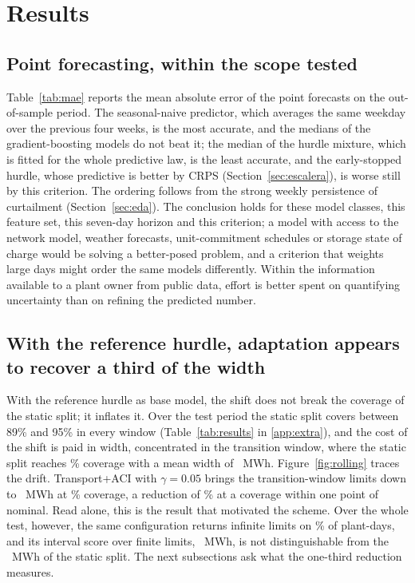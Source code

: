 \section{Results}
\label{sec:results}

\subsection{Point forecasting, within the scope tested}
\label{sec:punto}

Table~\ref{tab:mae} reports the mean absolute error of the point forecasts on the out-of-sample period. The seasonal-naive predictor, which averages the same weekday over the previous four weeks, is the most accurate, and the medians of the gradient-boosting models do not beat it; the median of the hurdle mixture, which is fitted for the whole predictive law, is the least accurate, and the early-stopped hurdle, whose predictive is better by CRPS (Section~\ref{sec:escalera}), is worse still by this criterion. The ordering follows from the strong weekly persistence of curtailment (Section~\ref{sec:eda}). The conclusion holds for these model classes, this feature set, this seven-day horizon and this criterion; a model with access to the network model, weather forecasts, unit-commitment schedules or storage state of charge would be solving a better-posed problem, and a criterion that weights large days might order the same models differently. Within the information available to a plant owner from public data, effort is better spent on quantifying uncertainty than on refining the predicted number.



\subsection{With the reference hurdle, adaptation appears to recover a third of the width}
\label{sec:hurdle}

With the reference hurdle as base model, the shift does not break the coverage of the static split; it inflates it. Over the test period the static split covers between 89\% and 95\% in every window (Table~\ref{tab:results} in \ref{app:extra}), and the cost of the shift is paid in width, concentrated in the transition window, where the static split reaches \% coverage with a mean width of ~MWh. Figure~\ref{fig:rolling} traces the drift. Transport+ACI with $\gamma=0.05$ brings the transition-window limits down to ~MWh at \% coverage, a reduction of \% at a coverage within one point of nominal. Read alone, this is the result that motivated the scheme. Over the whole test, however, the same configuration returns infinite limits on \% of plant-days, and its interval score over finite limits, ~MWh, is not distinguishable from the ~MWh of the static split. The next subsections ask what the one-third reduction measures.

